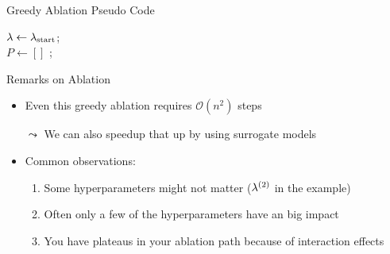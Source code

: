 \begin{frame}[c,fragile]{Greedy Ablation Pseudo Code}

\LinesNotNumbered
\begin{algorithm}[H]
	\BlankLine
	$\mathbf{\lambda} \leftarrow  \mathbf{\lambda}_{\text{start}}$; \\
	$P \leftarrow [] $ ;\\ 
	\pause
	\caption{Greedy Ablation}
	\end{algorithm}
	
\end{frame}
\begin{frame}[c,fragile]{Remarks on Ablation}

\begin{itemize}
	\item Even this greedy ablation requires $\mathcal{O}(n^2)$ steps 
	\pause
	\item[$\leadsto$] We can also speedup that up by using surrogate models\\
	\medskip
	\pause
	\item Common observations:
	\begin{enumerate}
		\item Some hyperparameters might not matter ($\mathbf{\lambda}^{(2)}$ in the example)
		\pause
		\item Often only a few of the hyperparameters have an big impact
		\pause
		\item You have plateaus in your ablation path because of interaction effects
	\end{enumerate}
\end{itemize}

\end{frame}



